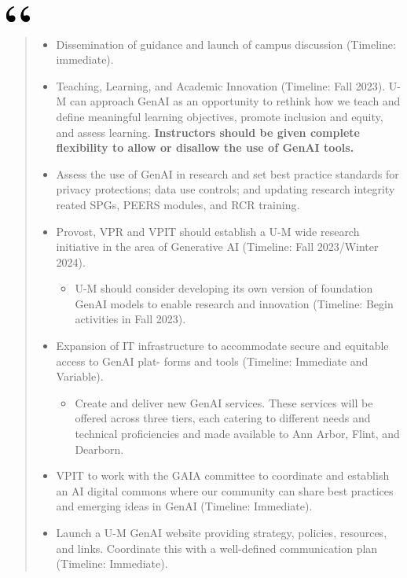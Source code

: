 \documentclass[
]{book}
\providecommand{\tightlist}{%
  \setlength{\itemsep}{0pt}\setlength{\parskip}{0pt}}
\begin{document}
\includegraphics[width=0.3125in,height=0.20833in]{open.png}

\begin{quote}
\begin{itemize}
\item
  Dissemination of guidance and launch of campus discussion (Timeline: immediate).
\item
  Teaching, Learning, and Academic Innovation (Timeline: Fall 2023). U-M can approach GenAI as an opportunity to rethink how we teach and define meaningful learning objectives, promote inclusion and equity, and assess learning. \textbf{Instructors should be given complete flexibility to allow or disallow the use of GenAI tools.}
\item
  Assess the use of GenAI in research and set best practice standards for privacy protections; data use controls; and updating research integrity reated SPGs, PEERS modules, and RCR training.
\item
  Provost, VPR and VPIT should establish a U-M wide research initiative in the area of Generative AI (Timeline: Fall 2023/Winter 2024).

  \begin{itemize}
  \tightlist
  \item
    U-M should consider developing its own version of foundation GenAI models to enable research and innovation (Timeline: Begin activities in Fall 2023).
  \end{itemize}
\item
  Expansion of IT infrastructure to accommodate secure and equitable access to GenAI plat- forms and tools (Timeline: Immediate and Variable).

  \begin{itemize}
  \tightlist
  \item
    Create and deliver new GenAI services. These services will be offered across three tiers, each catering to different needs and technical proficiencies and made available to Ann Arbor, Flint, and Dearborn.
  \end{itemize}
\item
  VPIT to work with the GAIA committee to coordinate and establish an AI digital commons where our community can share best practices and emerging ideas in GenAI (Timeline: Immediate).
\item
  Launch a U-M GenAI website providing strategy, policies, resources, and links. Coordinate this with a well-defined communication plan (Timeline: Immediate).
\end{itemize}
\end{quote}
\end{document}
